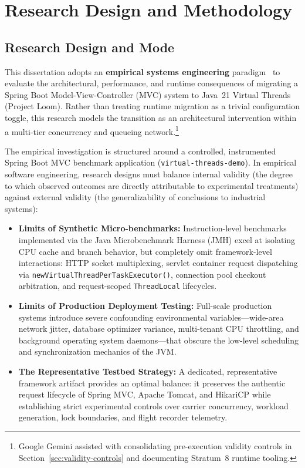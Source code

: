\chapter{Research Design and Methodology}
\label{ch:methodology}

\section{Research Design and Mode}
\label{sec:research-mode}

This dissertation adopts an \textbf{empirical systems engineering} paradigm~\cite{Wohlin2012,Runeson2009} to evaluate the architectural, performance, and runtime consequences of migrating a Spring Boot Model-View-Controller (MVC) system to Java~21 Virtual Threads (Project Loom). Rather than treating runtime migration as a trivial configuration toggle, this research models the transition as an architectural intervention within a multi-tier concurrency and queueing network.\footnote{Google Gemini assisted with consolidating pre-execution validity controls in Section~\ref{sec:validity-controls} and documenting Stratum~8 runtime tooling.}

The empirical investigation is structured around a controlled, instrumented Spring Boot MVC benchmark application (\texttt{virtual-threads-demo}). In empirical software engineering, research designs must balance internal validity (the degree to which observed outcomes are directly attributable to experimental treatments) against external validity (the generalizability of conclusions to industrial systems):
\begin{itemize}
  \item \textbf{Limits of Synthetic Micro-benchmarks:} Instruction-level benchmarks implemented via the Java Microbenchmark Harness (JMH) excel at isolating CPU cache and branch behavior, but completely omit framework-level interactions: HTTP socket multiplexing, servlet container request dispatching via \texttt{newVirtualThreadPerTaskExecutor()}, connection pool checkout arbitration, and request-scoped \texttt{ThreadLocal} lifecycles.
  \item \textbf{Limits of Production Deployment Testing:} Full-scale production systems introduce severe confounding environmental variables---wide-area network jitter, database optimizer variance, multi-tenant CPU throttling, and background operating system daemons---that obscure the low-level scheduling and synchronization mechanics of the JVM.
  \item \textbf{The Representative Testbed Strategy:} A dedicated, representative framework artifact provides an optimal balance: it preserves the authentic request lifecycle of Spring MVC, Apache Tomcat, and HikariCP while establishing strict experimental controls over carrier concurrency, workload generation, lock boundaries, and flight recorder telemetry.
\end{itemize}

